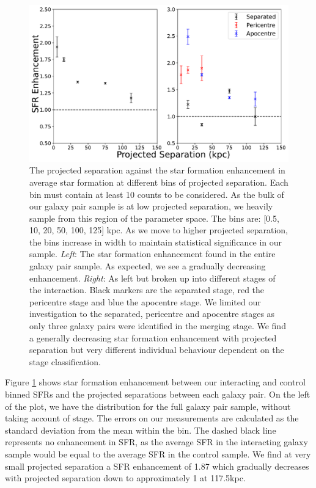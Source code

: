 \begin{figure}
    \centering
    \includegraphics[width=\textwidth]{Chapter3/figures/sfr-enhancement-projected-sep.pdf}
    \caption[The projected separation against the star formation enhancement in average star formation at different bins of projected separation.]{The projected separation against the star formation enhancement in average star formation at different bins of projected separation. Each bin must contain at least 10 counts to be considered. As the bulk of our galaxy pair sample is at low projected separation, we heavily sample from this region of the parameter space. The bins are: [0.5, 10, 20, 50, 100, 125] kpc. As we move to higher projected separation, the bins increase in width to maintain statistical significance in our sample. \textit{Left}: The star formation enhancement found in the entire galaxy pair sample. As expected, we see a gradually decreasing enhancement. \textit{Right}: As left but broken up into different stages of the interaction. Black markers are the separated stage, red the pericentre stage and blue the apocentre stage. We limited our investigation to the separated, pericentre and apocentre stages as only three galaxy pairs were identified in the merging stage. We find a generally decreasing star formation enhancement with projected separation but very different individual behaviour dependent on the stage classification.}
    \label{fig:sfr-enhancement-sep}
\end{figure}

Figure \ref{fig:sfr-enhancement-sep} shows star formation enhancement between our interacting and control binned SFRs and the projected separations between each galaxy pair. On the left of the plot, we have the distribution for the full galaxy pair sample, without taking account of stage. The errors on our measurements are calculated as the standard deviation from the mean within the bin. The dashed black line represents no enhancement in SFR, as the average SFR in the interacting galaxy sample would be equal to the average SFR in the control sample. We find at very small projected separation a SFR enhancement of 1.87 which gradually decreases with projected separation down to approximately 1 at 117.5kpc. 

